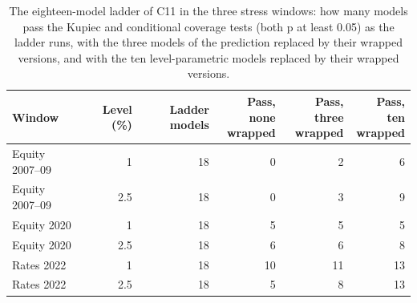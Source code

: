 \begin{table}[htbp]
\centering
\small
\caption{The eighteen-model ladder of C11 in the three stress windows: how many models pass the Kupiec and conditional coverage tests (both p at least 0.05) as the ladder runs, with the three models of the prediction replaced by their wrapped versions, and with the ten level-parametric models replaced by their wrapped versions.}
\label{tab:ladder-context}
{\footnotesize\setlength{\tabcolsep}{4pt}
\begin{adjustbox}{max width=\textwidth}
\begin{tabular}{lrrrrr}
\toprule
Window & Level (\%) & Ladder models & \makecell[br]{Pass, none \\ wrapped} & \makecell[br]{Pass, three \\ wrapped} & \makecell[br]{Pass, ten \\ wrapped} \\
\midrule
Equity 2007--09 & 1 & 18 & 0 & 2 & 6 \\
Equity 2007--09 & 2.5 & 18 & 0 & 3 & 9 \\
Equity 2020 & 1 & 18 & 5 & 5 & 5 \\
Equity 2020 & 2.5 & 18 & 6 & 6 & 8 \\
Rates 2022 & 1 & 18 & 10 & 11 & 13 \\
Rates 2022 & 2.5 & 18 & 5 & 8 & 13 \\
\bottomrule
\end{tabular}
\end{adjustbox}}
\end{table}
